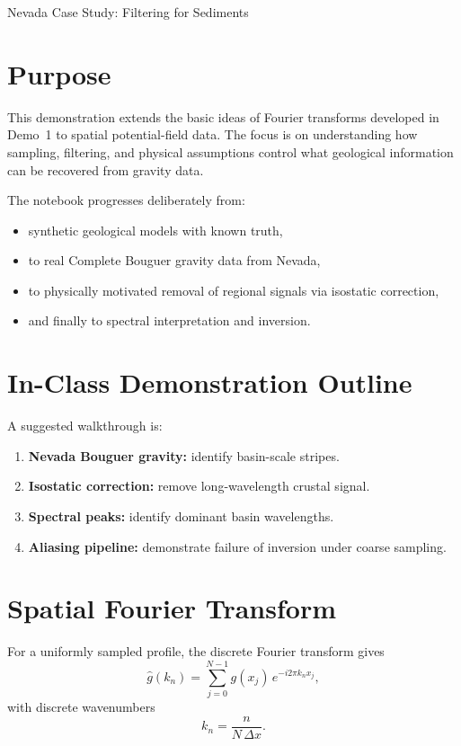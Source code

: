 \begin{activity}{Nevada Case Study: Filtering for Sediments}

\section*{Purpose}

This demonstration extends the basic ideas of Fourier transforms developed in Demo~1 to spatial potential-field data.  The focus is on understanding how sampling, filtering, and physical assumptions control what geological information can be recovered from gravity data.

The notebook progresses deliberately from:
\begin{itemize}
  \item synthetic geological models with known truth,
  \item to real Complete Bouguer gravity data from Nevada,
  \item to physically motivated removal of regional signals via isostatic correction,
  \item and finally to spectral interpretation and inversion.
\end{itemize}

\section*{In-Class Demonstration Outline}

A suggested walkthrough is:

\begin{enumerate}
  \item \textbf{Nevada Bouguer gravity:} identify basin-scale stripes.
  \item \textbf{Isostatic correction:} remove long-wavelength crustal signal.
  \item \textbf{Spectral peaks:} identify dominant basin wavelengths.
  \item \textbf{Aliasing pipeline:} demonstrate failure of inversion under coarse sampling.
\end{enumerate}


\section*{Spatial Fourier Transform}

For a uniformly sampled profile, the discrete Fourier transform gives
\begin{equation}
\hat{g}(k_n) = \sum_{j=0}^{N-1} g(x_j)\, e^{-i 2\pi k_n x_j},
\end{equation}
with discrete wavenumbers
\begin{equation}
k_n = \frac{n}{N\,\Delta x}.
\end{equation}


\end{activity}
